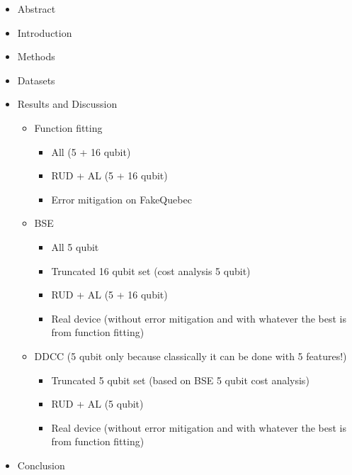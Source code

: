 \documentclass[journal=jacsat,manuscript=article]{achemso}
\begin{document}
\newpage
\begin{itemize}
	\item Abstract
	\item Introduction
	\item Methods
	\item Datasets
	\item Results and Discussion
	\begin{itemize}
		\item Function fitting 
		\begin{itemize}
			\item All (5 + 16 qubit)
			\item RUD + AL (5 + 16 qubit)
			\item Error mitigation on FakeQuebec
		\end{itemize}
		\item BSE
		\begin{itemize}
			\item All 5 qubit
			\item Truncated 16 qubit set (cost analysis 5 qubit)
			\item RUD + AL (5 + 16 qubit)
			\item Real device (without error mitigation and with whatever the best is from function fitting)
		\end{itemize}		
		\item DDCC (5 qubit only because classically it can be done with 5 features!)
		\begin{itemize}
			\item Truncated  5 qubit set (based on BSE 5 qubit cost analysis)
			\item RUD + AL (5 qubit)
			\item Real device (without error mitigation and with whatever the best is from function fitting)
		\end{itemize}				
	\end{itemize}
	\item Conclusion
\end{itemize}

\newpage
\setcounter{secnumdepth}{1}
\end{document}
